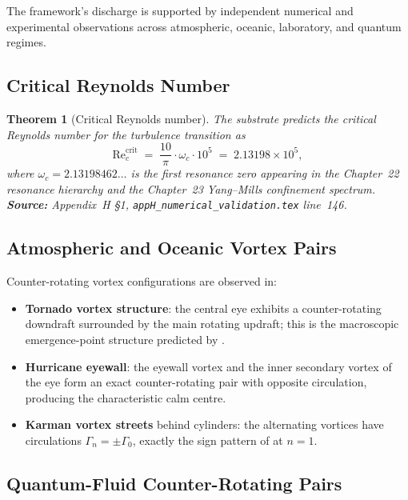 \documentclass[11pt,a4paper]{article}
\theoremstyle{plain}
\newtheorem{theorem}{Theorem}[section]
\theoremstyle{definition}
\begin{document}
The framework's discharge is supported by independent numerical and
experimental observations across atmospheric, oceanic, laboratory,
and quantum regimes.

\subsection{Critical Reynolds Number}

\begin{theorem}[Critical Reynolds number]
\label{thm:reynolds}
The substrate predicts the critical Reynolds number for the
turbulence transition as
\[
\mathrm{Re}_{c}^{\mathrm{crit}} \;=\; \frac{10}{\pi}\cdot\omega_{c}\cdot 10^{5}
   \;=\; 2.13198\times 10^{5},
\]
where $\omega_{c} = 2.13198462\ldots$ is the first resonance zero
appearing in the Chapter~22 resonance hierarchy and the Chapter~23
Yang--Mills confinement spectrum.
\textbf{Source:} Appendix~H \S 1, \texttt{appH\_numerical\_validation.tex}
line~146.
\end{theorem}

\subsection{Atmospheric and Oceanic Vortex Pairs}

Counter-rotating vortex configurations are observed in:
\begin{itemize}[leftmargin=*]
\item \textbf{Tornado vortex structure}: the central eye exhibits a
counter-rotating downdraft surrounded by the main rotating updraft;
this is the macroscopic emergence-point structure predicted by
.
\item \textbf{Hurricane eyewall}: the eyewall vortex and the inner
secondary vortex of the eye form an exact counter-rotating pair with
opposite circulation, producing the characteristic calm centre.
\item \textbf{Karman vortex streets} behind cylinders: the alternating
vortices have circulations $\Gamma_{n} = \pm \Gamma_{0}$, exactly the
sign pattern of  at $n = 1$.
\end{itemize}

\subsection{Quantum-Fluid Counter-Rotating Pairs}
\end{document}
